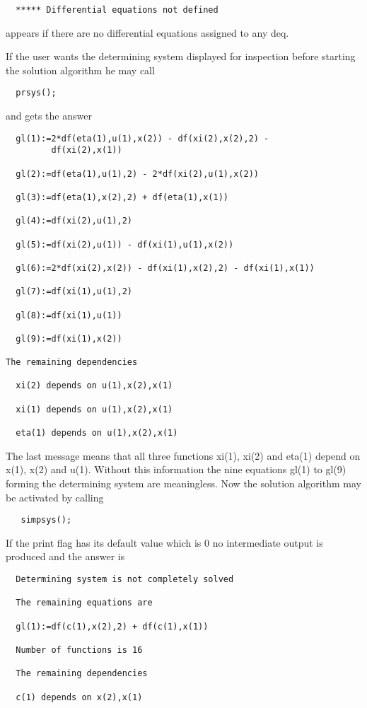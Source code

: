 \begin{verbatim}
  ***** Differential equations not defined
\end{verbatim}

appears if there are no differential equations assigned to any deq.

If the user wants the determining system displayed for inspection
before starting the solution algorithm he may call

\begin{verbatim}
  prsys();
\end{verbatim}

and gets the answer

\begin{verbatim}
  gl(1):=2*df(eta(1),u(1),x(2)) - df(xi(2),x(2),2) -
         df(xi(2),x(1))

  gl(2):=df(eta(1),u(1),2) - 2*df(xi(2),u(1),x(2))

  gl(3):=df(eta(1),x(2),2) + df(eta(1),x(1))

  gl(4):=df(xi(2),u(1),2)

  gl(5):=df(xi(2),u(1)) - df(xi(1),u(1),x(2))

  gl(6):=2*df(xi(2),x(2)) - df(xi(1),x(2),2) - df(xi(1),x(1))

  gl(7):=df(xi(1),u(1),2)

  gl(8):=df(xi(1),u(1))

  gl(9):=df(xi(1),x(2))

The remaining dependencies

  xi(2) depends on u(1),x(2),x(1)

  xi(1) depends on u(1),x(2),x(1)

  eta(1) depends on u(1),x(2),x(1)
\end{verbatim}

The last message means that all three functions xi(1), xi(2) and
eta(1) depend on x(1), x(2) and u(1). Without this information the
nine equations gl(1) to gl(9) forming the determining system are
meaningless. Now the solution algorithm may be activated by calling

\begin{verbatim}
   simpsys();
\end{verbatim}

If the print flag  has its default value which is 0 no
intermediate output is produced and the answer is

\begin{verbatim}
  Determining system is not completely solved

  The remaining equations are

  gl(1):=df(c(1),x(2),2) + df(c(1),x(1))

  Number of functions is 16

  The remaining dependencies

  c(1) depends on x(2),x(1)
\end{verbatim}

